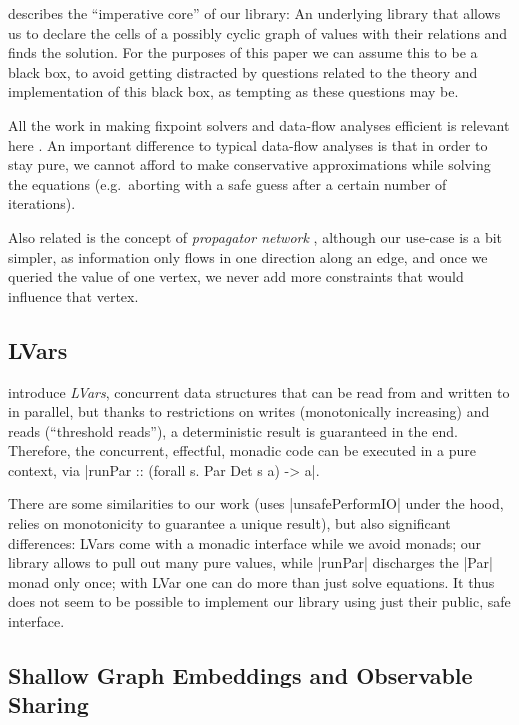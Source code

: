 \documentclass[manuscript,screen,acmsmall,nonacm]{acmart}
\begin{document}
 describes the “imperative core” of our library: An underlying library that allows us to declare the cells of a possibly cyclic graph of values with their relations and finds the solution. For the purposes of this paper we can assume this to be a black box, to avoid getting distracted by questions related to the theory and implementation of this black box, as tempting as these questions may be.

All the work in making fixpoint solvers and data-flow analyses efficient is relevant here \citep{kildall-73,kam-ullman-76}. An important difference to typical data-flow analyses is that in order to stay pure, we cannot afford to make conservative approximations while solving the equations (e.g.\ aborting with a safe guess after a certain number of iterations).

Also related is the concept of \emph{propagator network} \citep{propagator}, although our use-case is a bit simpler, as information only flows in one direction along an edge, and once we queried the value of one vertex, we never add more constraints that would influence that vertex.

\subsection{LVars}

 introduce \emph{LVars}, concurrent data structures that can be read from and written to in parallel, but thanks to restrictions on writes (monotonically increasing) and reads (“threshold reads”), a deterministic result is guaranteed in the end. Therefore, the concurrent, effectful, monadic code can be executed in a pure context, via |runPar :: (forall s. Par Det s a) -> a|.

There are some similarities to our work (uses |unsafePerformIO| under the hood, relies on monotonicity to guarantee a unique result), but also significant differences: LVars come with a monadic interface while we avoid monads; our library allows to pull out many pure values, while |runPar| discharges the |Par| monad only once; with LVar one can do more than just solve equations. It thus does not seem to be possible to implement our library using just their public, safe interface.


\subsection{Shallow Graph Embeddings and Observable Sharing}
\end{document}
